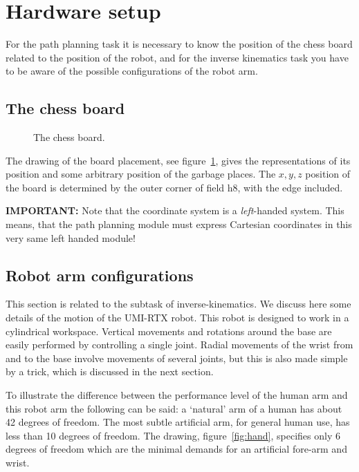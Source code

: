 \documentclass[10pt]{scrartcl}
\begin{document}
\section{Hardware setup}
\label{sec:Hardware}

For the path planning task it is necessary to know the position of the
chess board related to the position of the robot, and for the inverse
kinematics task you have to be aware of the possible configurations of
the robot arm.

\subsection{The chess board}
\label{setup}

\begin{figure}[htp]
  \centerline{}
  \caption{The chess board.}
  \label{FIG_chess_board}
\end{figure}

The drawing of the board placement, see figure~\ref{FIG_chess_board}, gives the
representations of its position and some arbitrary position of the garbage
places. The $x, y, z$ position of the board is determined by the outer corner
of field h8, with the edge included. %

{\bfseries IMPORTANT:} Note that the coordinate system is a {\em
left}-handed system. This means, that the path planning module must
express Cartesian coordinates in this very same left handed module! 

\subsection{Robot arm configurations}

This section is related to the subtask of inverse-kinematics. We discuss
here some details of the motion of the UMI-RTX robot. This robot is
designed to work in a cylindrical workspace. Vertical movements and
rotations around the base are easily performed by controlling a single
joint. Radial movements of the wrist from and to the base involve
movements of several joints, but this is also made simple by a trick,
which is discussed in the next section.

To illustrate the difference between the performance level of the human
arm and this robot arm the following can be said: a `natural' arm of a
human has about 42 degrees of freedom. The most subtle artificial arm, for
general human use, has less than 10 degrees of freedom. The drawing,
figure~\ref{fig:hand}, specifies only 6 degrees of freedom which are the minimal
demands for an artificial fore-arm and wrist.
                    
\end{document}
